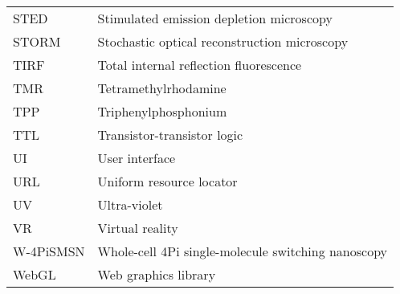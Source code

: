 \begin{flushleft}
\begin{longtable}[l]{|p{5.5em}|p{25em}|}
STED       & Stimulated emission depletion microscopy                   \\
STORM      & Stochastic optical reconstruction microscopy               \\
TIRF       & Total internal reflection fluorescence                     \\
TMR        & Tetramethylrhodamine                                       \\
TPP        & Triphenylphosphonium                                       \\
TTL        & Transistor-transistor logic                                \\
UI         & User interface                                             \\
URL        & Uniform resource locator                                   \\
UV         & Ultra-violet                                               \\
VR         & Virtual reality                                            \\
W-4PiSMSN  & Whole-cell 4Pi single-molecule switching nanoscopy         \\
WebGL      & Web graphics library
\\
\hline
\end{longtable}


\end{flushleft}

